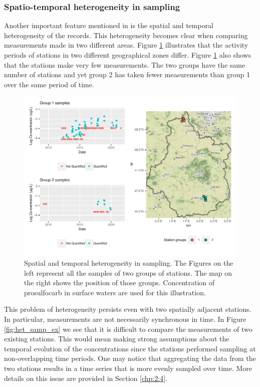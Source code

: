 \subsubsection{Spatio-temporal heterogeneity in sampling}

Another important feature mentioned in \cite{Baran2022} is the spatial and temporal heterogeneity of the records. This heterogeneity becomes clear when comparing measurements made in two different areas. Figure \ref{fig:het_sampspat} illustrates that the activity periods of stations in two different geographical zones differ. Figure \ref{fig:het_sampspat} also shows that the stations make very few measurements. The two groups have the same number of stations and yet group 2 has taken fewer measurements than group 1 over the same period of time.

\begin{figure}[htbp]
    \centering
    \includegraphics{figs/Chap3/Het_sampling.pdf}
    \caption{Spatial and temporal heterogeneity in sampling. The Figures on the left represent all the samples of two groups of stations. The map on the right shows the position of those groups. Concentration of prosulfocarb in surface waters are used for this illustration.}
    \label{fig:het_sampspat}
\end{figure}

This problem of heterogeneity persists even with two spatially adjacent stations. In particular, measurements are not necessarily synchronous in time. In Figure \ref{fig:het_samp_ex} we see that it is difficult to compare the measurements of two existing stations. This would mean making strong assumptions about the temporal evolution of the concentrations since the stations performed sampling at non-overlapping time periods. One may notice that aggregating the data from the two stations results in a time series that is more evenly sampled over time. More details on this issue are provided in Section \ref{chp:2:4}.


